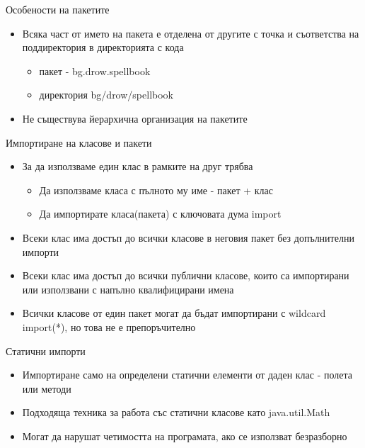\documentclass{beamer}
\begin{document}
\begin{frame}{Особености на пакетите}
  \transdissolve
  \begin{itemize}
  \item Всяка част от името на пакета е отделена от другите с точка и
    съответства на поддиректория в директорията с кода
    \begin{itemize}
    \item пакет - bg.drow.spellbook
    \item директория bg/drow/spellbook
    \end{itemize}
  \item Не съществува йерархична организация на пакетите
  \end{itemize}
\end{frame}

\begin{frame}{Импортиране на класове и пакети}
  \transdissolve
  \begin{itemize}
  \item За да използваме един клас в рамките на друг трябва
    \begin{itemize}
      \item Да използваме класа с пълното му име - пакет + клас
      \item Да импортирате класа(пакета) с ключовата дума import
    \end{itemize}
  \item Всеки клас има достъп до всички класове в неговия пакет без
    допълнителни импорти \pause
  \item Всеки клас има достъп до всички публични класове, които са
    импортирани или използвани с напълно квалифицирани имена \pause
  \item Всички класове от един пакет могат да бъдат импортирани с
    wildcard import(*), но това не е препоръчително
  \end{itemize}
\end{frame}

\begin{frame}{Статични импорти}
  \transdissolve
  \begin{itemize}
  \item Импортиране само на определени статични елементи от даден клас
    - полета или методи \pause
  \item Подходяща техника за работа със статични класове като
    java.util.Math \pause
  \item Могат да нарушат четимостта на програмата, ако се използват безразборно
  \end{itemize}
\end{frame}
\end{document}
